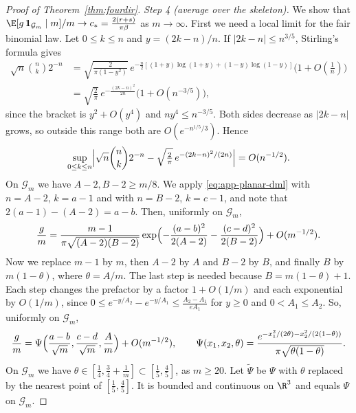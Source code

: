 \begin{proof}[Proof of Theorem~\ref{thm:fourdir}]
\emph{Step 4 (average over the skeleton).} We show that
$\E[g\,\mathbf 1_{\mathcal G_m}\mid m]/m\to c_*=\frac{2(r+s)}{\pi\beta}$ as $m\to\infty$. First we
need a local limit for the fair binomial law. Let $0\le k\le n$ and $y=(2k-n)/n$. If
$\lvert2k-n\rvert\le n^{3/5}$, Stirling's formula gives
\begin{align*}
 \sqrt n\binom nk2^{-n}&=\sqrt{\frac2{\pi(1-y^2)}}\,
 e^{-\frac n2[(1+y)\log(1+y)+(1-y)\log(1-y)]}\bigl(1+O(\tfrac1n)\bigr)\\
 &=\sqrt{\frac2\pi}\,e^{-\frac{(2k-n)^2}{2n}}\bigl(1+O(n^{-3/5})\bigr),
\end{align*}
since the bracket is $y^2+O(y^4)$ and $ny^4\le n^{-3/5}$. Both sides decrease as $\lvert2k-n\rvert$
grows, so outside this range both are $O(e^{-n^{1/5}/3})$. Hence
\begin{equation}\label{eq:app-planar-dml}
 \sup_{0\le k\le n}\Bigl\lvert\sqrt n\binom nk2^{-n}-\sqrt{\tfrac2\pi}\,e^{-(2k-n)^2/(2n)}\Bigr\rvert
 =O(n^{-1/2}).
\end{equation}
On $\mathcal G_m$ we have $A-2,B-2\ge m/8$. We apply \eqref{eq:app-planar-dml} with $n=A-2$,
$k=a-1$ and with $n=B-2$, $k=c-1$, and note that $2(a-1)-(A-2)=a-b$. Then, uniformly on
$\mathcal G_m$,
\[
 \frac gm=\frac{m-1}{\pi\sqrt{(A-2)(B-2)}}
 \exp\Bigl(-\frac{(a-b)^2}{2(A-2)}-\frac{(c-d)^2}{2(B-2)}\Bigr)+O(m^{-1/2}).
\]
Now we replace $m-1$ by $m$, then $A-2$ by $A$ and $B-2$ by $B$, and finally $B$ by $m(1-\theta)$,
where $\theta=A/m$. The last step is needed because $B=m(1-\theta)+1$. Each step changes the
prefactor by a factor $1+O(1/m)$ and each exponential by $O(1/m)$, since
$0\le e^{-y/A_2}-e^{-y/A_1}\le\frac{A_2-A_1}{eA_1}$ for $y\ge0$ and $0<A_1\le A_2$. So, uniformly on
$\mathcal G_m$,
\[
 \frac gm=\Psi\Bigl(\frac{a-b}{\sqrt m},\frac{c-d}{\sqrt m},\frac Am\Bigr)+O(m^{-1/2}),\qquad
 \Psi(x_1,x_2,\theta)=\frac{e^{-x_1^2/(2\theta)-x_2^2/(2(1-\theta))}}{\pi\sqrt{\theta(1-\theta)}}.
\]
On $\mathcal G_m$ we have $\theta\in[\frac14,\frac34+\frac1m]\subset[\frac15,\frac45]$, as $m\ge20$.
Let $\tilde\Psi$ be $\Psi$ with $\theta$ replaced by the nearest point of $[\frac15,\frac45]$. It is
bounded and continuous on $\R^3$ and equals $\Psi$ on $\mathcal G_m$.


\end{proof}
